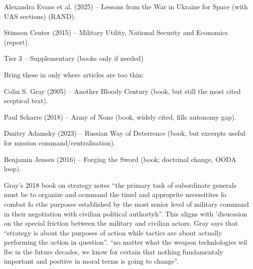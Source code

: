 Alexandra Evans et al. (2025) – Lessons from the War in Ukraine for Space (with UAS sections) (RAND).

Stimson Center (2015) – Military Utility, National Security and Economics (report).

Tier 3 – Supplementary (books only if needed)

Bring these in only where articles are too thin:

Colin S. Gray (2005) – Another Bloody Century (book, but still the most cited sceptical text).

Paul Scharre (2018) – Army of None (book, widely cited, fills autonomy gap).

Dmitry Adamsky (2023) – Russian Way of Deterrence (book, but excerpts useful for mission command/centralisation).

Benjamin Jensen (2016) – Forging the Sword (book; doctrinal change, OODA loop).




Gray's 2018 book on strategy \parencite{GRAY_2018} notes ``the primary task of subordinate generals must be to organize and ocmmand the timel and approprite necessitites fo combat fo rthe purposes established by the most senior level of military command in their negotiation with civilian political authortyh''. This aligns with \parencite{COHEN_2002}'disucssion on the special friction between the military and civilian actors. Gray says that ``strategy is about the purposes of action while tactics are about actually performing the action in question''. ``no matter what the weapon technlologies wil lbe in the future decades, we know for certain that nothing fundamentaly important and positive in moral terms is going to change''.